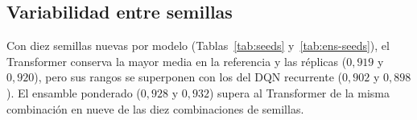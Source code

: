 \documentclass[../00_Main/Main.tex]{subfiles}
\begin{document}
\subsection{Variabilidad entre semillas}\label{sec:res-seeds}

Con diez semillas nuevas por modelo (Tablas~\ref{tab:seeds}
y~\ref{tab:ens-seeds}), el Transformer conserva la mayor media en la
referencia y las r\'eplicas ($0{,}919$ y $0{,}920$), pero sus rangos se
superponen con los del DQN recurrente ($0{,}902$ y $0{,}898$). El ensamble
ponderado ($0{,}928$ y $0{,}932$) supera al Transformer de la misma
combinaci\'on en nueve de las diez combinaciones de semillas.

\biblio %
\end{document}
